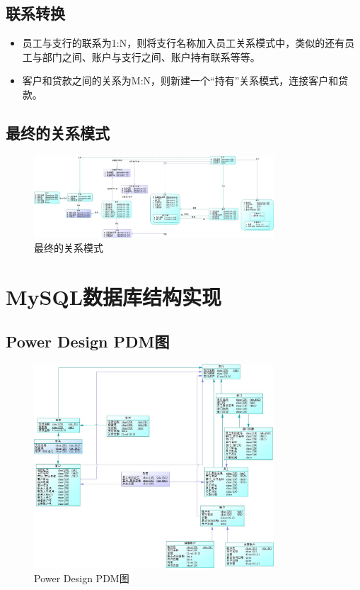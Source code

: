 \documentclass{article}
\begin{document}
    \subsection{联系转换}
    \begin{itemize}
        \item 员工与支行的联系为1:N，则将支行名称加入员工关系模式中，类似的还有员工与部门之间、账户与支行之间、账户持有联系等等。
        \item 客户和贷款之间的关系为M:N，则新建一个``持有''关系模式，连接客户和贷款。
    \end{itemize}
    \subsection{最终的关系模式}
    \begin{figure}[H]
        \centering
        \includegraphics[width=0.8\textwidth]{./lab02/ldm.jpg}
        \caption{最终的关系模式}
    \end{figure}
    \section{MySQL数据库结构实现}
    \subsection{Power Design PDM图}
    \begin{figure}[H]
        \centering
        \includegraphics[width=0.8\textwidth]{./lab02/pdm.jpg}
        \caption{Power Design PDM图}
    \end{figure}
\end{document}
